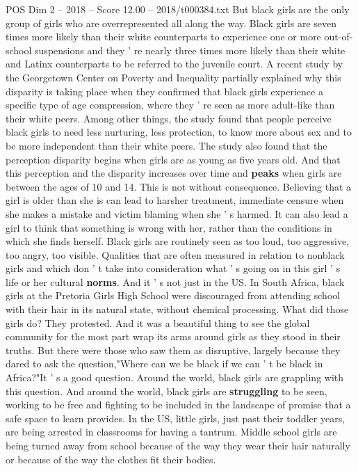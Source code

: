 \begin{textsample}{POS Dim 2 – 2018 – Score 12.00 – 2018/t000384.txt}
But black girls are the only group of girls who are overrepresented all along the way.
Black girls are seven times more likely than their white counterparts to experience one or more out-of-school suspensions and they ' re nearly three times more likely than their white and Latinx counterparts to be referred to the juvenile court.
A recent study by the Georgetown Center on Poverty and Inequality partially explained why this disparity is taking place when they confirmed that black girls experience a specific type of age compression, where they ' re seen as more adult-like than their white peers.
Among other things, the study found that people perceive black girls to need less nurturing, less protection, to know more about sex and to be more independent than their white peers.
The study also found that the perception disparity begins when girls are as young as five years old.
And that this perception and the disparity increases over time and \textbf{peaks} when girls are between the ages of 10 and 14.
This is not without consequence.
Believing that a girl is older than she is can lead to harsher treatment, immediate censure when she makes a mistake and victim blaming when she ' s harmed.
It can also lead a girl to think that something is wrong with her, rather than the conditions in which she finds herself.
Black girls are routinely seen as too loud, too aggressive, too angry, too visible.
Qualities that are often measured in relation to nonblack girls and which don ' t take into consideration what ' s going on in this girl ' s life or her cultural \textbf{norms}.
And it ' s not just in the US.
In South Africa, black girls at the Pretoria Girls High School were discouraged from attending school with their hair in its natural state, without chemical processing.
What did those girls do?
They protested.
And it was a beautiful thing to see the global community for the most part wrap its arms around girls as they stood in their truths.
But there were those who saw them as disruptive, largely because they dared to ask the question,"Where can we be black if we can ' t be black in Africa?"It ' s a good question.
Around the world, black girls are grappling with this question.
And around the world, black girls are \textbf{struggling} to be seen, working to be free and fighting to be included in the landscape of promise that a safe space to learn provides.
In the US, little girls, just past their toddler years, are being arrested in classrooms for having a tantrum.
Middle school girls are being turned away from school because of the way they wear their hair naturally or because of the way the clothes fit their bodies.

\end{textsample}
